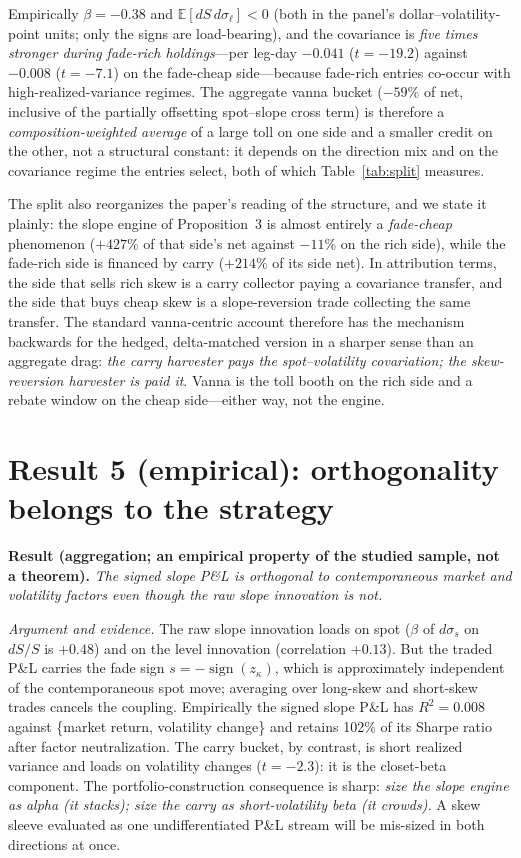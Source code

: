 \documentclass[11pt]{article}
\begin{document}
Empirically $\beta = -0.38$ and $\mathbb E[dS\, d\sigma_\ell] < 0$ (both in the panel's
dollar--volatility-point units; only the signs are load-bearing), and the covariance is
\emph{five times stronger during fade-rich holdings}---per leg-day $-0.041$ ($t = -19.2$)
against $-0.008$ ($t = -7.1$) on the fade-cheap side---because fade-rich entries co-occur with
high-realized-variance regimes. The aggregate vanna bucket ($-59\%$ of net, inclusive of the
partially offsetting spot--slope cross term) is therefore a \emph{composition-weighted
average} of a large toll on one side and a smaller credit on the other, not a structural
constant: it depends on the direction mix and on the covariance regime the entries select,
both of which Table~\ref{tab:split} measures.

The split also reorganizes the paper's reading of the structure, and we state it plainly: the
slope engine of Proposition~3 is almost entirely a \emph{fade-cheap} phenomenon ($+427\%$ of
that side's net against $-11\%$ on the rich side), while the fade-rich side is financed by
carry ($+214\%$ of its side net). In attribution terms, the side that sells rich skew is a
carry collector paying a covariance transfer, and the side that buys cheap skew is a
slope-reversion trade collecting the same transfer. The standard vanna-centric account
therefore has the mechanism backwards for the hedged, delta-matched version in a sharper sense
than an aggregate drag: \emph{the carry harvester pays the spot--volatility covariation; the
skew-reversion harvester is paid it}. Vanna is the toll booth on the rich side and a rebate
window on the cheap side---either way, not the engine.

\section{Result 5 (empirical): orthogonality belongs to the strategy}
\textbf{Result (aggregation; an empirical property of the studied sample, not a theorem).}
\emph{The signed slope P\&L is orthogonal to contemporaneous market and volatility factors even
though the raw slope innovation is not.}

\emph{Argument and evidence.} The raw slope innovation loads on spot ($\beta$ of $d\sigma_s$
on $dS/S$ is $+0.48$) and on the level innovation (correlation $+0.13$). But the traded P\&L
carries the fade sign $s = -\operatorname{sign}(z_\kappa)$, which is approximately independent
of the contemporaneous spot move; averaging over long-skew and short-skew trades cancels the
coupling. Empirically the signed slope P\&L has $R^2 = 0.008$ against \{market return,
volatility change\} and retains 102\% of its Sharpe ratio after factor neutralization. The
carry bucket, by contrast, is short realized variance and loads on volatility changes
($t = -2.3$): it is the closet-beta component. The portfolio-construction consequence is
sharp: \emph{size the slope engine as alpha (it stacks); size the carry as short-volatility
beta (it crowds).} A skew sleeve evaluated as one undifferentiated P\&L stream will be
mis-sized in both directions at once.
\end{document}
